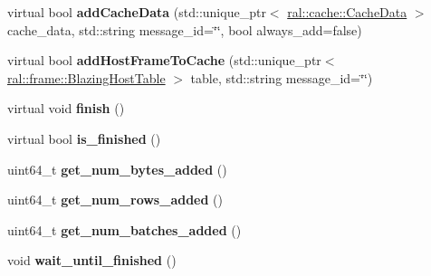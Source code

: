 \begin{DoxyCompactItemize}
\item 
\mbox{\label{classral_1_1cache_1_1CacheMachine_abfda7b34f09919f0d6e787f7e60c6f5f}} 
virtual bool {\bfseries add\+Cache\+Data} (std\+::unique\+\_\+ptr$<$ \hyperlink{classral_1_1cache_1_1CacheData}{ral\+::cache\+::\+Cache\+Data} $>$ cache\+\_\+data, std\+::string message\+\_\+id=\char`\"{}\char`\"{}, bool always\+\_\+add=false)
\item 
\mbox{\label{classral_1_1cache_1_1CacheMachine_a3e8733825ff2953c131b7fd3abd07e3f}} 
virtual bool {\bfseries add\+Host\+Frame\+To\+Cache} (std\+::unique\+\_\+ptr$<$ \hyperlink{classral_1_1frame_1_1BlazingHostTable}{ral\+::frame\+::\+Blazing\+Host\+Table} $>$ table, std\+::string message\+\_\+id=\char`\"{}\char`\"{})
\item 
\mbox{\label{classral_1_1cache_1_1CacheMachine_aab478de640f49d2fa11ba204f102153a}} 
virtual void {\bfseries finish} ()
\item 
\mbox{\label{classral_1_1cache_1_1CacheMachine_a4d319a36a1b4144b6325d3d82786b7ef}} 
virtual bool {\bfseries is\+\_\+finished} ()
\item 
\mbox{\label{classral_1_1cache_1_1CacheMachine_ab0f88af62cb603f08cda0586bdab5103}} 
uint64\+\_\+t {\bfseries get\+\_\+num\+\_\+bytes\+\_\+added} ()
\item 
\mbox{\label{classral_1_1cache_1_1CacheMachine_aa6615e5845b771141193fac07dfa995d}} 
uint64\+\_\+t {\bfseries get\+\_\+num\+\_\+rows\+\_\+added} ()
\item 
\mbox{\label{classral_1_1cache_1_1CacheMachine_aabae7b958940395ee04d563f33a58dcf}} 
uint64\+\_\+t {\bfseries get\+\_\+num\+\_\+batches\+\_\+added} ()
\item 
\mbox{\label{classral_1_1cache_1_1CacheMachine_a6d6fc8c2a2ae96c3d22b2a78baf8baf8}} 
void {\bfseries wait\+\_\+until\+\_\+finished} ()
\item 
\mbox{\label{classral_1_1cache_1_1CacheMachine_a212df32ccc0efca1acec0b2030ee195e}} 

\end{DoxyCompactItemize}
